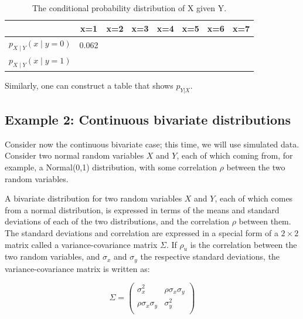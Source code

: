 \documentclass[12pt,]{krantz}
\theoremstyle{definition}
\theoremstyle{definition}
\theoremstyle{definition}
\theoremstyle{remark}
\begin{document}
\begin{table}[!htbp]
\begin{center}
\begin{tabular}{c|ccccccc}
    & x=1 & x=2 & x=3 & x=4 & x=5 & x=6 & x=7\\ 
\hline  
$p_{X\mid Y}(x\mid y=0)$  & 0.062 &  & & & & & \\
$p_{X\mid Y}(x\mid y=1)$  &  &  & & & & &  \\
\end{tabular}
\end{center}
\caption{The conditional probability distribution of X given Y.}
\label{XgivenY}
\end{table}

Similarly, one can construct a table that shows \(p_{Y|X}\).

\hypertarget{example-2-continuous-bivariate-distributions}{%
\subsection{Example 2: Continuous bivariate distributions}\label{example-2-continuous-bivariate-distributions}}

Consider now the continuous bivariate case; this time, we will use simulated data. Consider two normal random variables \(X\) and \(Y\), each of which coming from, for example, a Normal(0,1) distribution, with some correlation \(\rho\) between the two random variables.

A bivariate distribution for two random variables \(X\) and \(Y\), each of which comes from a normal distribution, is expressed in terms of the means and standard deviations of each of the two distributions, and the correlation \(\rho\) between them. The standard deviations and correlation are expressed in a special form of a \(2\times 2\) matrix called a variance-covariance matrix \(\Sigma\). If \(\rho_u\) is the correlation between the two random variables, and \(\sigma _{x}\) and \(\sigma _{y}\) the respective standard deviations, the variance-covariance matrix is written as:

\begin{equation}\label{eq:covmatfoundations}
\Sigma
=
\begin{pmatrix}
\sigma _{x}^2  & \rho\sigma _{x}\sigma _{y}\\
\rho\sigma _{x}\sigma _{y}    & \sigma _{y}^2\\
\end{pmatrix}
\end{equation}
\end{document}

